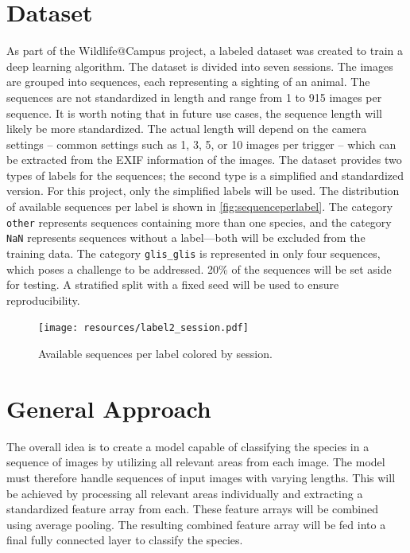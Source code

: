 \documentclass{article}
\begin{document}
\section*{Dataset} %

As part of the Wildlife@Campus project, a labeled dataset was created to train a deep learning algorithm.
The dataset is divided into seven sessions. The images are grouped into sequences, each representing a sighting
of an animal. The sequences are not standardized in length and range from 1 to 915 images per sequence.
It is worth noting that in future use cases, the sequence length will likely be more standardized.
The actual length will depend on the camera settings -- common settings such as 1, 3, 5, or 10 images per trigger --
which can be extracted from the EXIF information of the images. The dataset provides two types of labels for the sequences;
the second type is a simplified and standardized version. For this project, only the simplified labels
will be used. The distribution of available sequences per label is shown in \autoref{fig:sequenceperlabel}.
The category \texttt{other} represents sequences containing more than one species, and the category \texttt{NaN}
represents sequences without a label—both will be excluded from the training data.
The category \texttt{glis\_glis} is represented in only four sequences, which poses a challenge to be addressed.
20\% of the sequences will be set aside for testing. A stratified split with a fixed seed will be used to ensure
reproducibility.

\begin{figure}[ht]
  \centering
  \texttt{[image: resources/label2\_session.pdf]}
  \caption{Available sequences per label colored by session.}
  \label{fig:sequenceperlabel}
\end{figure}

\section*{General Approach} %

The overall idea is to create a model capable of classifying the species in a sequence of images by utilizing all relevant 
areas from each image. The model must therefore handle sequences of input images with varying lengths.
This will be achieved by processing all relevant areas individually and extracting a standardized feature array from 
each. These feature arrays will be combined using average pooling. The resulting combined feature array
will be fed into a final fully connected layer to classify the species.
\end{document}
